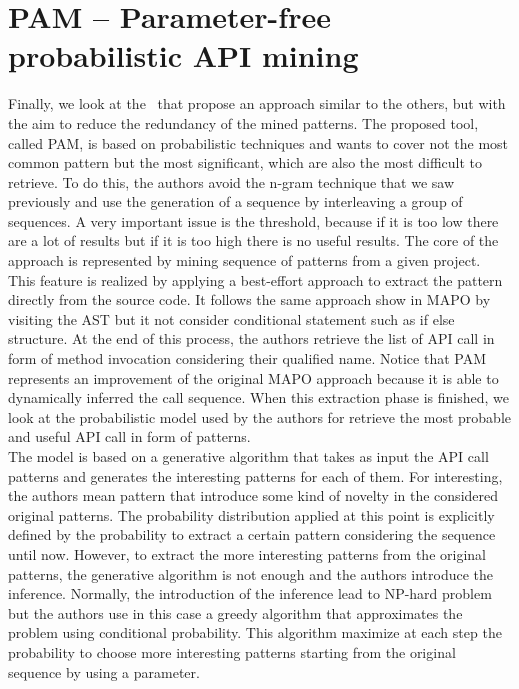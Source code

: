 \section{PAM -- Parameter-free probabilistic API mining}
Finally, we look at the~\cite{fowkes_parameter-free_2016} that propose an approach similar to the others, but with the aim to reduce the redundancy of the mined patterns. The proposed tool, called PAM, is based on probabilistic techniques and wants to cover not the most common pattern but the most significant, which are also the most difficult to retrieve. To do this, the authors avoid the n-gram technique that we saw previously and use the generation of a sequence by interleaving a group of sequences. A very important issue is the threshold, because if it is too low there are a lot of results but if it is too high there is no useful results. The core of the approach is represented by mining sequence of patterns from a given project. \\
This feature is realized by applying a best-effort approach to extract the pattern directly from the source code. It follows the same approach show in MAPO by visiting the AST but it not consider conditional statement such as if else structure. At the end of this process, the authors retrieve the list of API call in form of method invocation considering their qualified name. Notice that PAM represents an improvement of the original MAPO approach because it is able to dynamically inferred the call sequence. When this extraction phase is finished, we look at the probabilistic model used by the authors for retrieve the most probable and useful API call in form of patterns. \\
The model is based on a generative algorithm that takes as input the API call patterns and generates the interesting patterns for each of them. For interesting, the authors mean pattern that introduce some kind of novelty in the considered original patterns. The probability distribution applied at this point is explicitly defined by the probability to extract a certain pattern considering the sequence until now. However, to extract the more interesting patterns from the original patterns, the generative algorithm is not enough and the authors introduce the inference. Normally, the introduction of the inference lead to NP-hard problem but the authors use in this case a greedy algorithm that approximates the problem using conditional probability. This algorithm maximize at each step the probability to choose more interesting patterns starting from the original sequence by using a parameter. \newline
